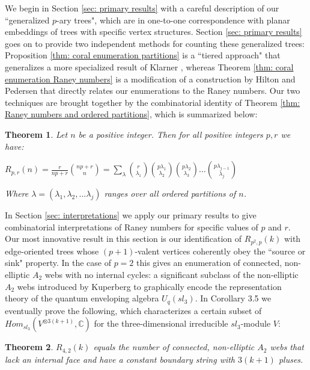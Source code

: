 \documentclass[documentfleqn,12pt]{amsart}
\newtheorem{theorem}{Theorem}[section]
\def\C{\mathbb{C}}
\begin{document}
We begin in Section \ref{sec: primary results} with a careful description of our ``generalized $p$-ary trees", which are in one-to-one correspondence with planar embeddings of trees with specific vertex structures.  Section \ref{sec: primary results} goes on to provide two independent methods for counting these generalized trees: Proposition \ref{thm: coral enumeration partitions} is a ``tiered approach" that generalizes a more specialized  result of Klarner \cite{Klarner}, whereas Theorem \ref{thm: coral enumeration Raney numbers} is a modification of a construction by Hilton and Pedersen \cite{HP} that directly relates our enumerations to the Raney numbers.  Our two techniques are brought together by the combinatorial identity of Theorem \ref{thm: Raney numbers and ordered partitions}, which is summarized below:

\begin{theorem}
\label{thm: intro theorem 1}
Let $n$ be a positive integer.  Then for all positive integers $p,r$ we have:

\begin{center}
$\displaystyle{R_{p,r}(n) = \frac{r}{np+r}\binom{np+r}{n} = \sum_\lambda \binom{r}{\lambda_1} \binom{p \lambda_1}{\lambda_2} \binom{p \lambda_2}{\lambda_3} \hdots \binom{p \lambda_{j-1}}{\lambda_j}}$
\end{center}
\noindent Where $\lambda = (\lambda_1,\lambda_2,...\lambda_j)$ ranges over all ordered partitions of $n$.
\end{theorem}

In Section \ref{sec: interpretations} we apply our primary results to give combinatorial interpretations of Raney numbers for specific values of $p$ and $r$.  Our most innovative result in this section is our identification of $R_{p^2,p}(k)$ with edge-oriented trees whose $(p+1)$-valent vertices coherently obey the ``source or sink" property.  In the case of $p=2$ this gives an enumeration of connected, non-elliptic $A_2$ webs with no internal cycles: a significant subclass of the non-elliptic $A_2$ webs introduced by Kuperberg \cite{Kup} to graphically encode the representation theory of the quantum enveloping algebra $U_q(sl_3)$.  In Corollary 3.5 we eventually prove the following, which characterizes a certain subset of $Hom_{sl_3}(V^{\otimes 3(k+1)}, \C)$ for the three-dimensional irreducible $sl_3$-module $V$:

\begin{theorem}
\label{thm: intro theorem 2}
$R_{4,2}(k)$ equals the number of connected, non-elliptic $A_2$ webs that lack an internal face and have a constant boundary string with $3(k+1)$ pluses.
\end{theorem}
\end{document}
